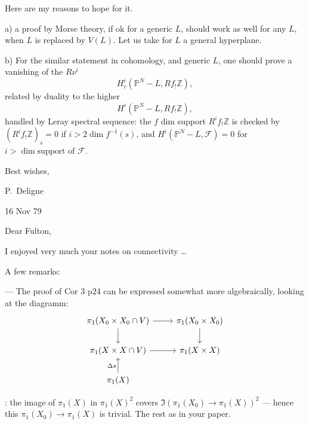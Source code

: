 \documentclass[11pt,a4paper]{article}
\theoremstyle{plain}
\theoremstyle{definition}
\begin{document}
\medskip

Here are my reasons to hope for it.

a) a proof by Morse theory, if ok for a generic $L$, should work as well for any $L$, when $L$ is replaced by $V(L)$. Let us take for $L$ a general hyperplane.

\newpage

b) For the similar statement in cohomology, and generic $L$, one should prove a vanishing of the $R\nu^i$
\[
H_c^i(\mathbb{P}^N - L, Rf_! \mathbb{Z}),
\]
related by duality to the higher
\[
H^i(\mathbb{P}^N - L, Rf_! \mathbb{Z}),
\]
handled by Leray spectral sequence: the $f$ dim support $R^i f_! \mathbb{Z}$ is checked by $(R^i f_! \mathbb{Z})_s = 0$ if $i > 2 \dim f^{-1}(s)$, and $H^i(\mathbb{P}^N - L, \mathcal{F}) = 0$ for $i > \dim \text{support of } \mathcal{F}$.

\vspace{1cm}

\begin{flushright}
Best wishes,

P.~Deligne
\end{flushright}

\newpage

\begin{flushright}
16 Nov 79
\end{flushright}

\noindent Dear Fulton,

\medskip

I enjoyed very much your notes on connectivity \ldots

A few remarks:

\medskip

--- The proof of Cor 3 p24 can be expressed somewhat more algebraically, looking at the diagramm:
\[
\begin{tikzcd}
\pi_1(X_0 \times X_0 \cap V) \arrow[r] \arrow[d] & \pi_1(X_0 \times X_0) \arrow[d] \\
\pi_1(X \times X \cap V) \arrow[r] & \pi_1(X \times X) \\
\pi_1(X) \arrow[u, "\Delta s"]
\end{tikzcd}
\]

: the image of $\pi_1(X)$ in $\pi_1(X)^2$ covers $\Im(\pi_1(X_0) \to \pi_1(X))^2$ --- hence this $\pi_1(X_0) \to \pi_1(X)$ is trivial. The rest as in your paper.

\medskip
\end{document}
